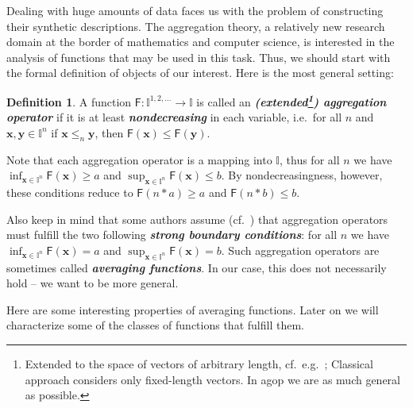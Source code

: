 \documentclass[11pt]{article}\usepackage[]{graphicx}\usepackage[]{color}
\renewcommand{\emph}[1]{\textbf{\textsl{#1}}}
\newcommand{\package}[1]{\textsf{#1}\xspace}
\newcommand{\vect}[1]{{\mathbf{#1}}}
\newcommand{\func}[1]{{\mathsf{#1}}}
\newcommand{\Ival}{\mathbb{I}}
\newcommand{\IvalPow}[1]{\mathbb{I}^{#1}}
\newcommand{\AnyPow}{^{1,2,\dots}}
\newcommand{\IvalAnyPow}{\mathbb{I}\AnyPow}
\theoremstyle{remark}
\theoremstyle{definition}
\newtheorem{definition}[theorem]{Definition}
\begin{document}
Dealing with huge amounts of data
faces us with the problem of constructing their synthetic descriptions.
The aggregation theory,
a relatively new research domain at the border of mathematics and
computer science, is interested in the analysis
of functions that may be used in this task.
Thus, we should start with the formal definition of
objects of our interest.
Here is the most general setting:


%

\begin{definition}
A function $\func{F}: \IvalAnyPow\to\Ival$
is called an \emph{(extended\footnote{Extended to the
space of vectors of arbitrary length, cf.~e.g.~\cite{CalvoMayor1999:remarks2eaf,
GrabischETAL2009:aggregationfunctions}; Classical approach
considers only fixed-length vectors.
In \package{agop} we are as much general as possible.}) aggregation operator}
if it is at least \emph{nondecreasing} in each variable,
i.e.~for all $n$ and $\vect{x},\vect{y}\in\IvalPow{n}$
if $\vect{x}\le_n\vect{y}$, then $\func{F}(\vect{x})\le\func{F}(\vect{y})$.
\end{definition}

Note that each aggregation operator is a mapping into $\Ival$,
thus for all $n$ we have $\inf_{\vect{x}\in\IvalPow{n}} \func{F}(\vect{x}) \ge a$
and $\sup_{\vect{x}\in\IvalPow{n}} \func{F}(\vect{x}) \le b$.
By nondecreasingness, however, these conditions reduce to
$\func{F}(n\ast a)\ge a$ and $\func{F}(n\ast b)\le b$.

Also keep in mind that some authors assume
(cf.~\cite{GrabischETAL2009:aggregationfunctions})\label{Prop:StrongBoundaryCond}
that aggregation operators must fulfill the two following \emph{strong boundary
conditions}: for all $n$ we have
$\inf_{\vect{x}\in\IvalPow{n}} \func{F}(\vect{x}) =a$
and $\sup_{\vect{x}\in\IvalPow{n}} \func{F}(\vect{x})= b$.
Such aggregation operators are sometimes called \emph{averaging functions}.
In our case, this does not necessarily hold -- we want to be
more general.


\bigskip
Here are some interesting properties of averaging functions.
Later on we will characterize some of the classes of functions
that fulfill them.
\end{document}
